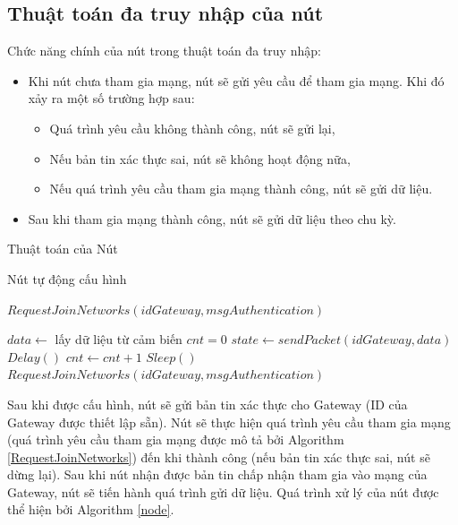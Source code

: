 \subsection{Thuật toán đa truy nhập của nút} 
Chức năng chính của nút trong thuật toán đa truy nhập:
\begin{itemize}
\item	Khi nút chưa tham gia mạng, nút sẽ gửi yêu cầu để tham gia mạng. Khi đó xảy ra một số trường hợp sau:
	\begin{itemize}
	\item	Quá trình yêu cầu không thành công, nút sẽ gửi lại,
	\item	Nếu bản tin xác thực sai, nút sẽ không hoạt động nữa,
	\item	Nếu quá trình yêu cầu tham gia mạng thành công, nút sẽ gửi dữ liệu.
	\end{itemize}
\item	Sau khi tham gia mạng thành công, nút sẽ gửi dữ liệu theo chu kỳ.
\end{itemize}
\begin{algorithm}[H]
	\caption{Thuật toán của Nút}
	\label{node}
	\begin{algorithmic}[1]
		\State Nút tự động cấu hình  
		
		 
		
		\State $RequestJoinNetworks(idGateway, msgAuthentication)$
		
				\State $data \gets$ lấy dữ liệu từ cảm biến
				\State $cnt = 0$
				\Repeat
					\State $state \gets sendPacket(idGateway, data)$ 
						\State $Delay()$
					\EndIf
					\State $cnt \gets cnt + 1$
				 
				\State $Sleep()$ 
				\Else
					\State $RequestJoinNetworks(idGateway, msgAuthentication)$
				\EndIf
		\EndWhile
	\end{algorithmic}
\end{algorithm}
Sau khi được cấu hình, nút sẽ gửi bản tin xác thực cho Gateway (ID của Gateway được thiết lập sẵn). Nút sẽ thực hiện quá trình yêu cầu tham gia mạng (quá trình yêu cầu tham gia mạng được mô tả bởi Algorithm \ref{RequestJoinNetworks}) đến khi thành công (nếu bản tin xác thực sai, nút sẽ dừng lại). Sau khi nút nhận được bản tin chấp nhận tham gia vào mạng của Gateway, nút sẽ tiến hành quá trình gửi dữ liệu. Quá trình xử lý của nút được thể hiện bởi Algorithm \ref{node}{}.
